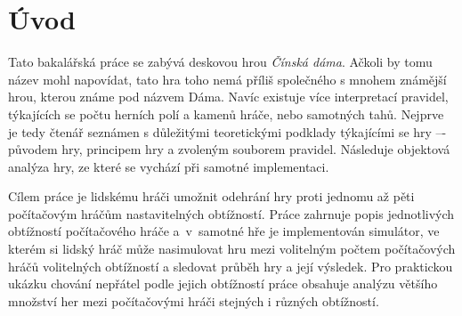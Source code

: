\chapter{Úvod}
\label{sec:Introduction}
Tato bakalářská práce se zabývá deskovou hrou \emph{Čínská dáma}. Ačkoli by tomu název mohl napovídat, tato hra toho nemá příliš společného s mnohem známější hrou, kterou známe pod názvem Dáma. Navíc existuje více interpretací pravidel, týkajících se počtu herních polí a kamenů hráče, nebo samotných tahů. Nejprve je tedy čtenář seznámen s důležitými teoretickými podklady týkajícími se hry –- původem hry, principem hry a zvoleným souborem pravidel. Následuje objektová analýza hry, ze které se vychází při samotné implementaci.

Cílem práce je lidskému hráči umožnit odehrání hry proti jednomu až pěti počítačovým hráčům nastavitelných obtížností. Práce zahrnuje popis jednotlivých obtížností počítačového hráče a~v~samotné hře je implementován simulátor, ve kterém si lidský hráč může nasimulovat hru mezi volitelným počtem počítačových hráčů volitelných obtížností a sledovat průběh hry a její výsledek. Pro praktickou ukázku chování nepřátel podle jejich obtížností práce obsahuje analýzu většího množství her mezi počítačovými hráči stejných i různých obtížností.
\endinput